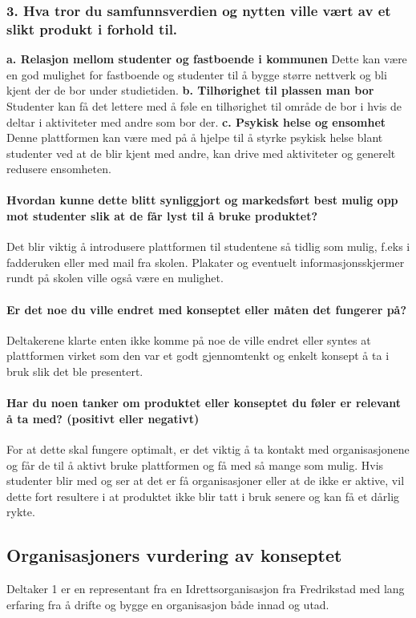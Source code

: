 \subsubsection{3. Hva tror du samfunnsverdien og nytten ville vært av et slikt produkt i forhold til.}
{\bf a. Relasjon mellom studenter og fastboende i kommunen}
Dette kan være en god mulighet for fastboende og studenter til å bygge større nettverk og bli kjent der de bor under studietiden.
{\bf b. Tilhørighet til plassen man bor}
Studenter kan få det lettere med å føle en tilhørighet til område de bor i hvis de deltar i aktiviteter med andre som bor der.
{\bf c. Psykisk helse og ensomhet}
Denne plattformen kan være med på å hjelpe til å styrke psykisk helse blant studenter ved at de blir kjent med andre, kan drive med aktiviteter og generelt redusere ensomheten.

\paragraph{Hvordan kunne dette blitt synliggjort og markedsført best mulig opp mot studenter slik at de får lyst til å bruke produktet?}
Det blir viktig å introdusere plattformen til studentene så tidlig som mulig, f.eks i fadderuken eller med mail fra skolen. Plakater og eventuelt informasjonsskjermer rundt på skolen ville også være en mulighet.

\paragraph{Er det noe du ville endret med konseptet eller måten det fungerer på?}
Deltakerene klarte enten ikke komme på noe de ville endret eller syntes at plattformen virket som den var et godt gjennomtenkt og enkelt konsept å ta i bruk slik det ble presentert.

\paragraph{Har du noen tanker om produktet eller konseptet du føler er relevant å ta med? (positivt eller negativt)}
For at dette skal fungere optimalt, er det viktig å ta kontakt med organisasjonene og får de til å aktivt bruke plattformen og få med så mange som mulig. Hvis studenter blir med og ser at det er få organisasjoner eller at de ikke er aktive, vil dette fort resultere i at produktet ikke blir tatt i bruk senere og kan få et dårlig rykte. 


\subsection{Organisasjoners vurdering av konseptet}
Deltaker 1 er en representant fra en Idrettsorganisasjon fra Fredrikstad med lang erfaring fra å drifte og bygge en organisasjon både innad og utad.

